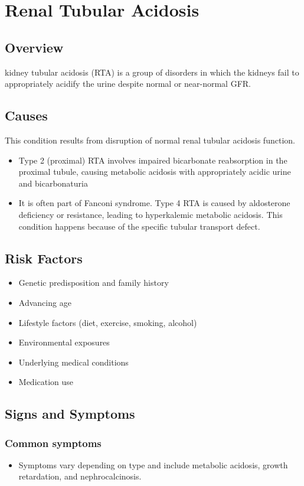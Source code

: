 \chapter{Renal Tubular Acidosis}
\label{sec:Renal Tubular Acidosis}

\section{Overview}
kidney tubular acidosis (RTA) is a group of disorders in which the kidneys fail to appropriately acidify the urine despite normal or near-normal GFR.
\section{Causes}
This condition results from disruption of normal renal tubular acidosis function.

\begin{itemize}[noitemsep]
  \item Type 2 (proximal) RTA involves impaired bicarbonate reabsorption in the proximal tubule, causing metabolic acidosis with appropriately acidic urine and bicarbonaturia
  \item It is often part of Fanconi syndrome. Type 4 RTA is caused by aldosterone deficiency or resistance, leading to hyperkalemic metabolic acidosis. This condition happens because of the specific tubular transport defect.
\end{itemize}
\section{Risk Factors}


\begin{itemize}[noitemsep]
  \item Genetic predisposition and family history
  \item Advancing age
  \item Lifestyle factors (diet, exercise, smoking, alcohol)
  \item Environmental exposures
  \item Underlying medical conditions
  \item Medication use
\end{itemize}
\section{Signs and Symptoms}

\subsection{Common symptoms}
\begin{itemize}[noitemsep]
  \item Symptoms vary depending on type and include metabolic acidosis, growth retardation, and nephrocalcinosis. 
  \end{itemize}

